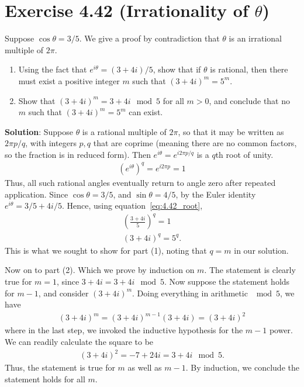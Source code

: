 \documentclass{book}
\begin{document}
\section*{Exercise 4.42 (Irrationality of $\theta$)}
    Suppose $\cos \theta = 3/5$. We give a proof by contradiction that $\theta$ is an irrational multiple of $2\pi$.
    \begin{enumerate}
        \item Using the fact that $e^{i\theta} = (3 + 4i)/5$, show that if $\theta$ is rational, then there must exist a positive integer $m$ such that $(3 + 4i)^m = 5^m$.
        \item Show that $(3 + 4i)^m = 3 + 4i \mod{5}$ for all $m>0$, and conclude that no $m$ such that $(3 + 4i)^m = 5^m$ can exist.
    \end{enumerate}

    \textbf{Solution}: Suppose $\theta$ is a rational multiple of $2\pi$, so that it may be written as $2\pi p/q$, with integers $p, q$ that are coprime (meaning there are no common factors, so the fraction is in reduced form). Then $e^{i\theta} = e^{i2\pi p/q}$ is a $q$th root of unity.
    \begin{align} \label{eq:4.42_root}
        (e^{i\theta})^q = e^{i2\pi p} = 1
    \end{align}
    Thus, all such rational angles eventually return to angle zero after repeated application. Since $\cos\theta = 3/5$, and $\sin \theta = 4/5$, by the Euler identity $e^{i\theta} = 3/5 + 4i/5$. Hence, using equation~\eqref{eq:4.42_root},
    \begin{align}
        \left(\frac{3 + 4i}{5}\right)^q = 1 \\
        (3 + 4i)^q = 5^q.
    \end{align}
    This is what we sought to show for part (1), noting that $q = m$ in our solution. 

    Now on to part (2). Which we prove by induction on $m$. The statement is clearly true for $m = 1$, since $3 + 4i = 3 + 4i \mod{5}$. Now suppose the statement holds for $m - 1$, and consider $(3 + 4i)^m$. Doing everything in arithmetic $\mod{5}$, we have
    \begin{align}
        (3 + 4i)^m = (3 + 4i)^{m-1}(3+4i) = (3 + 4i)^2
    \end{align}
    where in the last step, we invoked the inductive hypothesis for the $m-1$ power. We can readily calculate the square to be
    \begin{align}
        (3 + 4i)^2 = -7 + 24i = 3 + 4i \mod{5}.
    \end{align}
    Thus, the statement is true for $m$ as well as $m -1$. By induction, we conclude the statement holds for all $m$.
\end{document}
